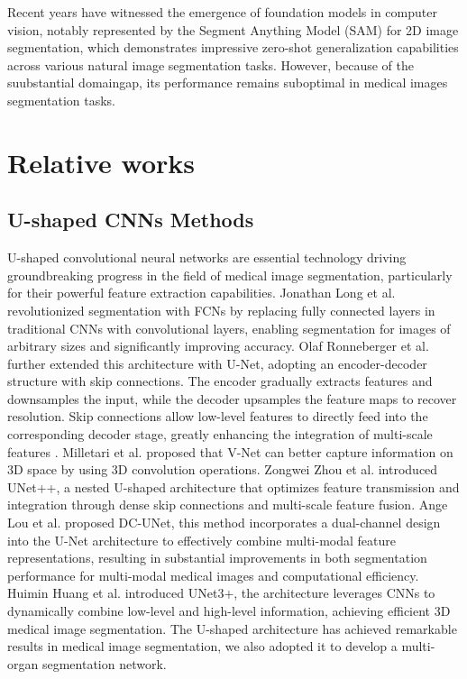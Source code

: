 \documentclass[sn-mathphys-num]{sn-jnl}
\theoremstyle{thmstyleone}%
\theoremstyle{thmstyletwo}%
\theoremstyle{thmstylethree}%
\begin{document}
Recent years have witnessed the emergence of foundation models in computer vision, notably represented by the Segment Anything Model (SAM) for 2D image segmentation, which demonstrates impressive zero-shot generalization capabilities across various natural image segmentation tasks.
However, because of the suubstantial domaingap, its performance remains suboptimal in medical images segmentation tasks.



\section{Relative works}\label{sec2}

\subsection{U-shaped CNNs Methods}
U-shaped convolutional neural networks are essential technology driving groundbreaking progress in the field of medical image segmentation, particularly for their powerful feature extraction capabilities. 
Jonathan Long et al. \cite{long2015fully} revolutionized segmentation with FCNs by replacing fully connected layers in traditional CNNs with convolutional layers, enabling segmentation for images of arbitrary sizes and significantly improving accuracy.
Olaf Ronneberger et al. \cite{ronneberger2015u} further extended this architecture with U-Net, adopting an encoder-decoder structure with skip connections.
The encoder gradually extracts features and downsamples the input, while the decoder upsamples the feature maps to recover resolution.
Skip connections allow low-level features to directly feed into the corresponding decoder stage, greatly enhancing the integration of multi-scale features \cite{aitken2021understanding}.
Milletari et al. \cite{milletari2016v} proposed that V-Net can better capture information on 3D space by using 3D convolution operations.
Zongwei Zhou et al. \cite{zhou2018unet++} introduced UNet++, a nested U-shaped architecture that optimizes feature transmission and integration through dense skip connections and multi-scale feature fusion.
Ange Lou et al. \cite{lou2021dc} proposed DC-UNet, this method incorporates a dual-channel design into the U-Net architecture to effectively combine multi-modal feature representations, resulting in substantial improvements in both segmentation performance for multi-modal medical images and computational efficiency.
Huimin Huang et al. \cite{huang2020unet} introduced UNet3+, the architecture leverages CNNs to dynamically combine low-level and high-level information, achieving efficient 3D medical image segmentation.
The U-shaped architecture has achieved remarkable results in medical image segmentation, we also adopted it to develop a multi-organ segmentation network.
\end{document}
